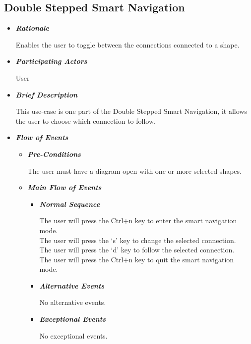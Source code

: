 \subsection{Double Stepped Smart Navigation}
\begin{itemize}

\item {\bf \em Rationale}
\par \noindent
Enables the user to toggle between the connections connected to a shape.

\item {\bf \em Participating Actors}
\par \noindent
User

\item {\bf \em Brief Description}
\par \noindent
This use-case is one part of the {\rm Double Stepped Smart Navigation}, it allows the user to choose which connection to follow.

\item {\bf \em Flow of Events}
\begin{itemize}

\item {\bf \em Pre-Conditions}
\par \noindent
The user must have a diagram open with one or more selected shapes.

\item {\bf \em Main Flow of Events}

\begin{itemize}

\item {\bf \em Normal Sequence}
\par \noindent
The user will press the Ctrl+n key to enter the smart navigation mode.\\
The user will press the `s' key to change the selected connection.\\
The user will press the `d' key to follow the selected connection.\\
The user will press the Ctrl+n key to quit the smart navigation mode.

\item {\bf \em Alternative Events}
\par \noindent
No alternative events.

\item {\bf \em Exceptional Events}
\par \noindent
No exceptional events.

\end{itemize}


\end{itemize}
\end{itemize}
